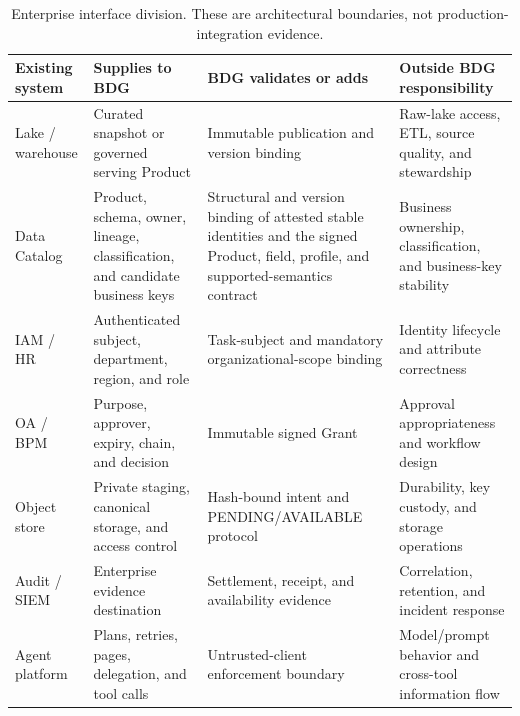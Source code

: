 \documentclass[journal,onecolumn]{IEEEtran}
\begin{document}
\begin{table}[h]
\centering
\caption{Enterprise interface division. These are architectural boundaries,
not production-integration evidence.}
\label{tab:supp-enterprise-interfaces}
\scriptsize
\setlength{\tabcolsep}{3pt}
\begin{tabular}{L{0.13\textwidth}L{0.23\textwidth}L{0.27\textwidth}L{0.27\textwidth}}
\toprule
Existing system & Supplies to BDG & BDG validates or adds & Outside BDG responsibility \\
\midrule
Lake / warehouse & Curated snapshot or governed serving Product & Immutable publication and version binding & Raw-lake access, ETL, source quality, and stewardship \\
Data Catalog & Product, schema, owner, lineage, classification, and candidate business keys & Structural and version binding of attested stable identities and the signed Product, field, profile, and supported-semantics contract & Business ownership, classification, and business-key stability \\
IAM / HR & Authenticated subject, department, region, and role & Task-subject and mandatory organizational-scope binding & Identity lifecycle and attribute correctness \\
OA / BPM & Purpose, approver, expiry, chain, and decision & Immutable signed Grant & Approval appropriateness and workflow design \\
Object store & Private staging, canonical storage, and access control & Hash-bound intent and PENDING/AVAILABLE protocol & Durability, key custody, and storage operations \\
Audit / SIEM & Enterprise evidence destination & Settlement, receipt, and availability evidence & Correlation, retention, and incident response \\
Agent platform & Plans, retries, pages, delegation, and tool calls & Untrusted-client enforcement boundary & Model/prompt behavior and cross-tool information flow \\
\bottomrule
\end{tabular}
\end{table}
\end{document}
